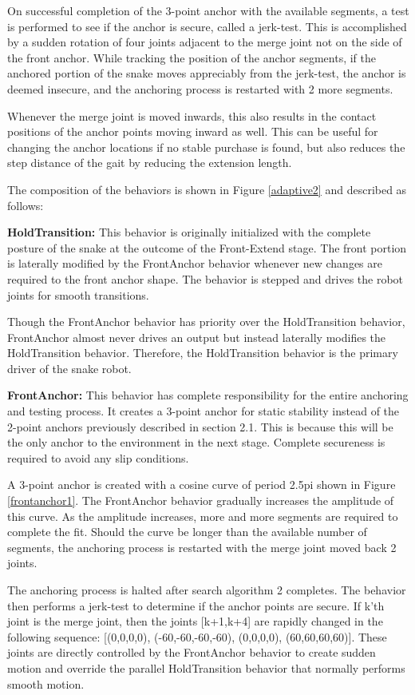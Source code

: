On successful completion of the 3-point anchor with the available segments, a test is performed to see if the anchor is secure, called a jerk-test.  This is accomplished by a sudden rotation of four joints adjacent to the merge joint not on the side of the front anchor.  While tracking the position of the anchor segments, if the anchored portion of the snake moves appreciably from the jerk-test, the anchor is deemed insecure, and the anchoring process is restarted with 2 more segments.

Whenever the merge joint is moved inwards, this also results in the contact positions of the anchor points moving inward as well.  This can be useful for changing the anchor locations if no stable purchase is found, but also reduces the step distance of the gait by reducing the extension length.

The composition of the behaviors is shown in Figure \ref{adaptive2} and described as follows:

\textbf{HoldTransition:}
This behavior is originally initialized with the complete posture of the snake at the outcome of the Front-Extend stage.  The front portion is laterally modified by the FrontAnchor behavior whenever new changes are required to the front anchor shape.  The behavior is stepped and drives the robot joints for smooth transitions.

Though the FrontAnchor behavior has priority over the HoldTransition behavior, FrontAnchor almost never drives an output but instead laterally modifies the HoldTransition behavior.  Therefore, the HoldTransition behavior is the primary driver of the snake robot.

\textbf{FrontAnchor:}
This behavior has complete responsibility for the entire anchoring and testing process.  It creates a 3-point anchor for static stability instead of the 2-point anchors previously described in section 2.1.  This is because this will be the only anchor to the environment in the next stage.  Complete secureness is required to avoid any slip conditions.

A 3-point anchor is created with a cosine curve of period 2.5pi shown in Figure \ref{frontanchor1}.  The FrontAnchor behavior gradually increases the amplitude of this curve.  As the amplitude increases, more and more segments are required to complete the fit.  Should the curve be longer than the available number of segments, the anchoring process is restarted with the merge joint moved back 2 joints.

The anchoring process is halted after search algorithm 2 completes.  The behavior then performs a jerk-test to determine if the anchor points are secure.  If k’th joint is the merge joint, then the joints [k+1,k+4] are rapidly changed in the following sequence:  [(0,0,0,0), (-60,-60,-60,-60), (0,0,0,0), (60,60,60,60)].  These joints are directly controlled by the FrontAnchor behavior to create sudden motion and override the parallel HoldTransition behavior that normally performs smooth motion.

